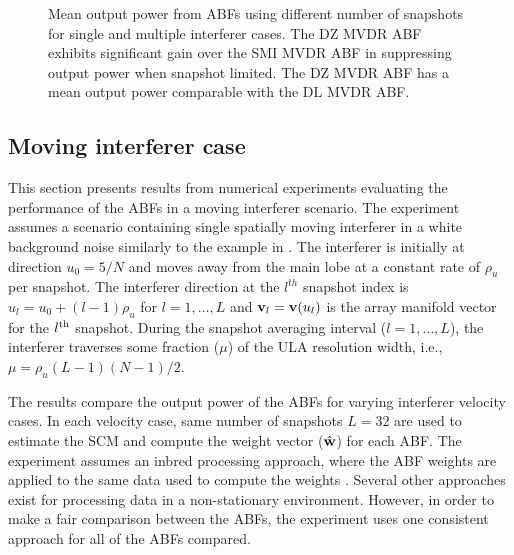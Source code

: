 \begin{figure*}[!hp]
\centering
{}
\hfil
{}
\caption{Mean output power from ABFs using different number of
  snapshots for single and multiple interferer cases. The DZ MVDR ABF
  exhibits significant gain over the SMI MVDR ABF in suppressing
  output power when snapshot limited. The DZ MVDR ABF has a mean output
  power comparable with the DL MVDR ABF.}
\label{fig:pout-snapshot}
\end{figure*}


\subsection{Moving interferer case} 
\label{sec:moving-interferer}
This section presents results from numerical experiments evaluating
the performance of the ABFs in a moving interferer scenario. The
experiment assumes a scenario containing single spatially moving
interferer in a white background noise similarly to the
example in \cite[Sec. 4]{cox2000mrabf}. The interferer is initially at
direction $u_0 = 5/N$ and moves away from the main lobe at a constant
rate of $\rho_u$ per snapshot. The interferer direction at the
$l^{th}$ snapshot index is $u_l = u_0 + (l-1) \rho_u $ for
$l = 1, \ldots, L$ and ${\bf v}_l = {\bf v}(u_l)$ is the array manifold
vector for the $l^{\rm th}$ snapshot. During the snapshot averaging
interval ($l = 1,\ldots, L$), the interferer traverses some fraction
($\mu$) of the ULA resolution width, i.e.,
$\mu = \rho_u (L-1)(N - 1)/2$.

The results compare the output power of the ABFs for
varying interferer velocity cases. In each velocity case, same
number of snapshots $L = 32$ are used to estimate the SCM and compute
the weight vector ($\hat{{\bf w}}$) for each ABF. The experiment assumes an
inbred processing approach, where the ABF weights are applied to the
same data used to compute the weights \cite{cox2002adaptive}. Several
other approaches exist for processing data in a non-stationary
environment. However, in order to make a fair comparison between the
ABFs, the experiment uses one consistent approach for all of the ABFs
compared.

